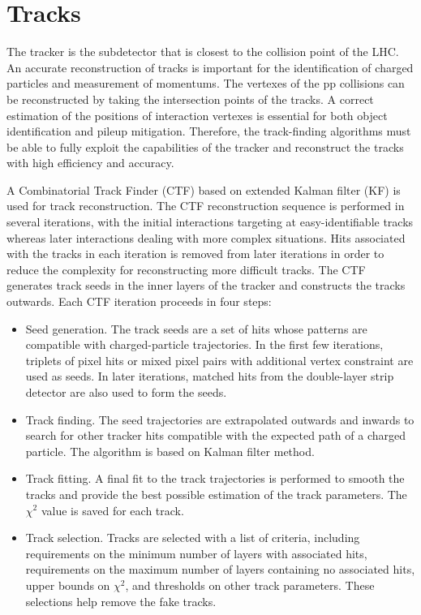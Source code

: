 \documentclass[thesis.tex]{subfiles}
\begin{document}
\section{Tracks}
The tracker is the subdetector that is closest to the collision point of the LHC. 
An accurate reconstruction of tracks is important for the identification of charged particles and measurement of momentums. 
The vertexes of the pp collisions can be reconstructed by taking the intersection points of the tracks.
A correct estimation of the positions of interaction vertexes is essential for both object identification and pileup mitigation.
Therefore, the track-finding algorithms must be able to fully exploit the capabilities of the tracker and reconstruct the tracks with high efficiency and accuracy. 

A Combinatorial Track Finder (CTF) based on extended Kalman filter (KF) is used for track reconstruction. 
The CTF reconstruction sequence is performed in several iterations, with the initial interactions targeting at easy-identifiable tracks whereas later interactions dealing with more complex situations. 
Hits associated with the tracks in each iteration is removed from later iterations in order to reduce the complexity for reconstructing more difficult tracks. 
The CTF generates track seeds in the inner layers of the tracker and constructs the tracks outwards. 
Each CTF iteration proceeds in four steps:

\begin{itemize}
	\item Seed generation. The track seeds are a set of hits whose patterns are compatible with charged-particle trajectories. 
		In the first few iterations, triplets of pixel hits or mixed pixel pairs with additional vertex constraint are used as seeds. 
		In later iterations, matched hits from the double-layer strip detector are also used to form the seeds. 
	\item Track finding. The seed trajectories are extrapolated outwards and inwards to search for other tracker hits compatible with the expected path of a charged particle. The algorithm is based on Kalman filter method. 
	\item Track fitting. A final fit to the track trajectories is performed to smooth the tracks and provide the best possible estimation of the track parameters. The $\chi^2$ value is saved for each track.
	\item Track selection. Tracks are selected with a list of criteria, including requirements on the minimum number of layers with associated hits, requirements on the maximum number of layers containing no associated hits, upper bounds on $\chi^2$, and thresholds on other track parameters. These selections help remove the fake tracks. 
\end{itemize}
\end{document}

